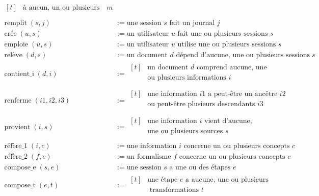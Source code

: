 {\begin{align*}
\begin{aligned}[t]
&\text{à aucun, un ou plusieurs métamodèles de document } m \\
\end{aligned}\\
\operatorname{remplit}(s,j) &:= \text{une session } s  \text{ fait un journal } j \\
\operatorname{crée}(u,s) &:= \text{un utilisateur } u  \text{ fait une ou plusieurs sessions } s \\
\operatorname{emploie}(u,s) &:= \text{un utilisateur } u  \text{ utilise une ou plusieurs sessions } s \\
\operatorname{relève}(d,s) &:= \text{un document } d  \text{ dépend d'aucune, une ou plusieurs sessions } s \\
\operatorname{contient\_i}(d,i) &:= 
\begin{aligned}[t]
&\text{un document } d  \text{ comprend aucune, une } \\
&\text{ou plusieurs informations } i \\
\end{aligned}\\
\operatorname{renferme}(i1,i2, i3) &:= 
\begin{aligned}[t]
&\text{une information } i1  \text{ a peut-être un ancêtre } i2 \\
&\text{ou peut-être plusieurs descendants } i3 \\
\end{aligned}\\
\operatorname{provient}(i,s) &:= 
\begin{aligned}[t]
&\text{une information } i  \text{ vient d'aucune, }\\
&\text{une ou plusieurs sources } s \\
\end{aligned}\\
\operatorname{réfère\_1}(i,c) &:= \text{une information } i  \text{ concerne un ou plusieurs concepts } c \\
\operatorname{réfère\_2}(f,c) &:= \text{un formalisme } f  \text{ concerne un ou plusieurs concepts } c \\
\operatorname{compose\_e}(s,e) &:= \text{une session } s  \text{ a une ou des étapes } e \\
\operatorname{compose\_t}(e,t) &:= 
\begin{aligned}[t]
&\text{une étape } e  \text{ a aucune, une ou plusieurs}\\
&\text{ transformations } t\\
\end{aligned}\\ 

\end{align*}}

